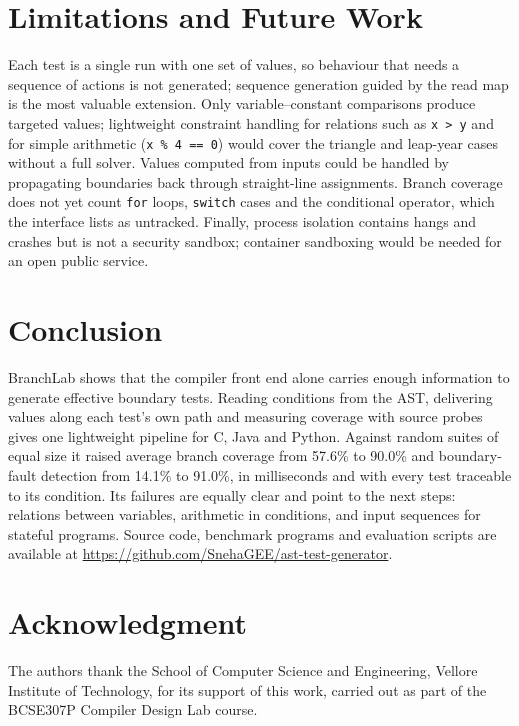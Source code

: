 \documentclass[conference]{IEEEtran}
\begin{document}
\section{Limitations and Future Work}\label{sec:future}
Each test is a single run with one set of values, so behaviour that needs a sequence of actions is not
generated; sequence generation guided by the read map is the most valuable extension. Only variable--constant
comparisons produce targeted values; lightweight constraint handling for relations such as \texttt{x > y} and
for simple arithmetic (\texttt{x \% 4 == 0}) would cover the triangle and leap-year cases without a full solver.
Values computed from inputs could be handled by propagating boundaries back through straight-line assignments.
Branch coverage does not yet count \texttt{for} loops, \texttt{switch} cases and the conditional operator, which
the interface lists as untracked. Finally, process isolation contains hangs and crashes but is not a security
sandbox; container sandboxing would be needed for an open public service.

\section{Conclusion}
BranchLab shows that the compiler front end alone carries enough information to generate effective boundary
tests. Reading conditions from the AST, delivering values along each test's own path and measuring coverage with
source probes gives one lightweight pipeline for C, Java and Python. Against random suites of equal size it
raised average branch coverage from 57.6\% to 90.0\% and boundary-fault detection from 14.1\% to
91.0\%, in milliseconds and with every test traceable to its condition. Its failures are equally clear and
point to the next steps: relations between variables, arithmetic in conditions, and input sequences for
stateful programs. Source code, benchmark programs and evaluation scripts are available at
\url{https://github.com/SnehaGEE/ast-test-generator}.

\section*{Acknowledgment}
The authors thank the School of Computer Science and Engineering, Vellore Institute of Technology, for its
support of this work, carried out as part of the BCSE307P Compiler Design Lab course.



\end{document}
